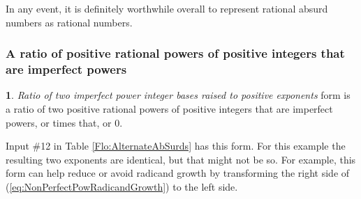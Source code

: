 \documentclass[12pt,english]{article}
\theoremstyle{definition}
\newtheorem*{defn*}{\protect\definitionname}
\theoremstyle{remark}
\theoremstyle{plain}
\theoremstyle{plain}
\providecommand{\definitionname}{Definition}
\begin{document}
In any event, it is definitely worthwhile overall to represent rational
absurd numbers as rational numbers.


\subsubsection{A ratio of positive rational powers of positive integers that are
imperfect powers\label{sub:RatioOf2NonPerfectPowers}\emph{\vspace{0.3em}
}}
\begin{defn*}
\textsl{Ratio of two imperfect power integer bases raised to positive
exponents} form is a ratio of two positive rational powers of positive
integers that are imperfect powers, or {\small } times that,
or 0.
\end{defn*}
Input \#12 in Table \ref{Flo:AlternateAbSurds} has this form. For
this example the resulting two exponents are identical, but that might
not be so. For example, this form can help reduce or avoid radicand
growth by transforming the right side of (\ref{eq:NonPerfectPowRadicandGrowth})
to the left side.
\end{document}

